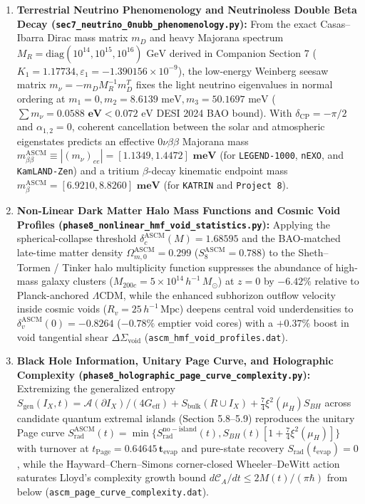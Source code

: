 \documentclass[aps,prd,onecolumn,superscriptaddress,nofootinbib,longbibliography,10pt]{revtex4-2}
\begin{document}
\begin{enumerate}
  
\item \textbf{Terrestrial Neutrino Phenomenology and Neutrinoless Double Beta Decay (\texttt{sec7_neutrino_0nubb_phenomenology.py}):} From the exact Casas–Ibarra Dirac mass matrix \(m_D\) and heavy Majorana spectrum \(M_R = \mathrm{diag}(10^{14}, 10^{15}, 10^{16})\text{ GeV}\) derived in Companion Section 7 (\(K_1 = 1.17734, \varepsilon_1 = -1.390156 \times 10^{-9}\)), the low-energy Weinberg seesaw matrix \(m_\nu = -m_D M_R^{-1} m_D^T\) fixes the light neutrino eigenvalues in normal ordering at \(m_1 = 0, m_2 = 8.6139\text{ meV}, m_3 = 50.1697\text{ meV}\) (\(\sum m_\nu = \mathbf{0.0588\text{ eV}} < 0.072\text{ eV}\) DESI 2024 BAO bound). With \(\delta_{\mathrm{CP}} = -\pi/2\) and \(\alpha_{1,2} = 0\), coherent cancellation between the solar and atmospheric eigenstates predicts an effective \(0\nu\beta\beta\) Majorana mass \(m_{\beta\beta}^{\mathrm{ASCM}} \equiv |(m_\nu)_{ee}| = \mathbf{[1.1349, 1.4472]\text{ meV}}\) (for \texttt{LEGEND-1000}, \texttt{nEXO}, and \texttt{KamLAND-Zen}) and a tritium \(\beta\)-decay kinematic endpoint mass \(m_\beta^{\mathrm{ASCM}} = \mathbf{[6.9210, 8.8260]\text{ meV}}\) (for \texttt{KATRIN} and \texttt{Project 8}).
  
\item \textbf{Non-Linear Dark Matter Halo Mass Functions and Cosmic Void Profiles (\texttt{phase8_nonlinear_hmf_void_statistics.py}):} Applying the spherical-collapse threshold \(\delta_c^{\mathrm{ASCM}}(M) = 1.68595\) and the BAO-matched late-time matter density \(\Omega_{m,0}^{\mathrm{ASCM}} = 0.299\) (\(S_8^{\mathrm{ASCM}} = 0.788\)) to the Sheth–Tormen / Tinker halo multiplicity function suppresses the abundance of high-mass galaxy clusters (\(M_{200c} = 5 \times 10^{14}\,h^{-1}\,M_\odot\)) at \(z = 0\) by \(\mathbf{-6.42\%}\) relative to Planck-anchored $\Lambda$CDM, while the enhanced subhorizon outflow velocity inside cosmic voids (\(R_v = 25\,h^{-1}\,\mathrm{Mpc}\)) deepens central void underdensities to \(\delta_v^{\mathrm{ASCM}}(0) = \mathbf{-0.8264}\) (\(\mathbf{-0.78\%}\) emptier void cores) with a \(+0.37\%\) boost in void tangential shear \(\Delta\Sigma_{\mathrm{void}}\) (\texttt{ascm_hmf_void_profiles.dat}).
  
\item \textbf{Black Hole Information, Unitary Page Curve, and Holographic Complexity (\texttt{phase8_holographic_page_curve_complexity.py}):} Extremizing the generalized entropy \(S_{\mathrm{gen}}(I_X, t) = \mathcal{A}(\partial I_X)/(4G_{\mathrm{eff}}) + S_{\mathrm{bulk}}(R \cup I_X) + \frac{7}{4}\xi^2(\mu_H)S_{BH}\) across candidate quantum extremal islands (Section 5.8–5.9) reproduces the unitary Page curve \(S_{\mathrm{rad}}^{\mathrm{ASCM}}(t) = \min\{S_{\mathrm{rad}}^{\mathrm{no-island}}(t), S_{BH}(t)[1 + \frac{7}{4}\xi^2(\mu_H)]\}\) with turnover at \(t_{\mathrm{Page}} = \mathbf{0.64645\,t_{\mathrm{evap}}}\) and pure-state recovery \(S_{\mathrm{rad}}(t_{\mathrm{evap}}) = 0\), while the Hayward–Chern–Simons corner-closed Wheeler–DeWitt action saturates Lloyd's complexity growth bound \(d\mathcal{C}_A/dt \le 2M(t)/(\pi\hbar)\) from below (\texttt{ascm_page_curve_complexity.dat}).


\end{enumerate}
\end{document}
